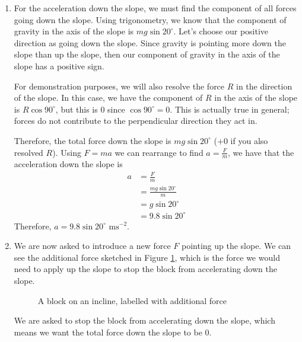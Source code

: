\begin{solution}
\begin{enumerate}
        Using $m = 20$ and $g = 9.8$, we have that $R = 20 \times 9.8 \times \cos 20^\circ$.

        \item 
        For the acceleration down the slope, we must find the component of all forces going down the slope.
        Using trigonometry, we know that the component of gravity in the axis of the slope is $mg \sin 20^\circ$. 
        Let's choose our positive direction as going down the slope. 
        Since gravity is pointing more down the slope than up the slope, then our component of gravity in the axis of the slope has a positive sign.

        For demonstration purposes, we will also resolve the force $R$ in the direction of the slope. In this case, we have the component of $R$ in the axis of the slope is $R \cos 90^\circ$, but this is $0$ since $\cos 90^\circ=0$. 
        This is actually true in general; forces do not contribute to the perpendicular direction they act in.

        Therefore, the total force down the slope is $mg \sin 20^\circ$ ($+0$ if you also resolved $R$).
        Using $F = ma$ we can rearrange to find $a = \frac{F}{m}$, we have that the acceleration down the slope is 
        \begin{align*}
            a &= \frac{F}{m} \\
            &= \frac{mg \sin 20^\circ}{m} \\
            &= g \sin 20^\circ \\
            &= 9.8 \sin 20^\circ
            \end{align*}
        Therefore, $a =  9.8 \sin 20^\circ \text{ ms}^{-2}$.
        \item
        We are now asked to introduce a new force $F$ pointing up the slope. We can see the additional force sketched in Figure \ref{fig:block-on-plane-no-forces-labelled-F}, which is the force we would need to apply up the slope to stop the block from accelerating down the slope.
        \begin{figure}[H]
            \centering
            \caption{A block on an incline, labelled with additional force}
            \label{fig:block-on-plane-no-forces-labelled-F}
        \end{figure}

        We are asked to stop the block from accelerating down the slope, which means we want the total force down the slope to be $0$.


\end{enumerate}
\end{solution}
